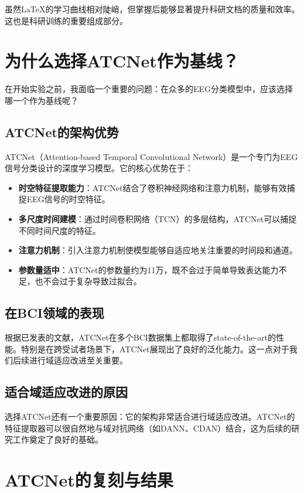 \documentclass[12pt,a4paper]{ctexart}
\begin{document}
虽然LaTeX的学习曲线相对陡峭，但掌握后能够显著提升科研文档的质量和效率。这也是科研训练的重要组成部分。

\section{为什么选择ATCNet作为基线？}

在开始实验之前，我面临一个重要的问题：在众多的EEG分类模型中，应该选择哪一个作为基线呢？

\subsection{ATCNet的架构优势}

ATCNet（Attention-based Temporal Convolutional Network）是一个专门为EEG信号分类设计的深度学习模型。它的核心优势在于：

\begin{itemize}
    \item \textbf{时空特征提取能力}：ATCNet结合了卷积神经网络和注意力机制，能够有效捕捉EEG信号的时空特征。
    \item \textbf{多尺度时间建模}：通过时间卷积网络（TCN）的多层结构，ATCNet可以捕捉不同时间尺度的特征。
    \item \textbf{注意力机制}：引入注意力机制使模型能够自适应地关注重要的时间段和通道。
    \item \textbf{参数量适中}：ATCNet的参数量约为11万，既不会过于简单导致表达能力不足，也不会过于复杂导致过拟合。
\end{itemize}

\subsection{在BCI领域的表现}

根据已发表的文献，ATCNet在多个BCI数据集上都取得了state-of-the-art的性能。特别是在跨受试者场景下，ATCNet展现出了良好的泛化能力。这一点对于我们后续进行域适应改进至关重要。

\subsection{适合域适应改进的原因}

选择ATCNet还有一个重要原因：它的架构非常适合进行域适应改进。ATCNet的特征提取器可以很自然地与域对抗网络（如DANN、CDAN）结合，这为后续的研究工作奠定了良好的基础。

\section{ATCNet的复刻与结果}
\end{document}
